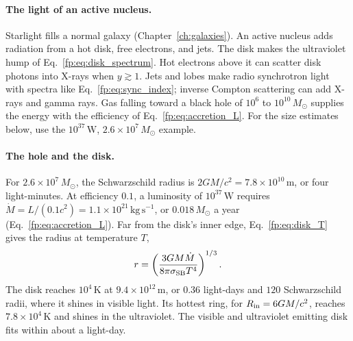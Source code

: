 \paragraph{The light of an active nucleus.} Starlight fills a normal galaxy (Chapter~\ref{ch:galaxies}). An active nucleus adds radiation from a hot disk, free electrons, and jets. The disk makes the ultraviolet hump of Eq.~\eqref{fp:eq:disk_spectrum}. Hot electrons above it can scatter disk photons into X-rays when $y\gtrsim1$. Jets and lobes make radio synchrotron light with spectra like Eq.~\eqref{fp:eq:sync_index}; inverse Compton scattering can add X-rays and gamma rays. Gas falling toward a black hole of $10^6$ to $10^{10}\,M_\odot$ supplies the energy with the efficiency of Eq.~\eqref{fp:eq:accretion_L}. For the size estimates below, use the $10^{37}\,\mathrm W$, $2.6\times10^7\,M_\odot$ example.

\paragraph{The hole and the disk.} For $2.6\times10^7\,M_\odot$, the Schwarzschild radius is $2GM/c^2=7.8\times10^{10}\,\mathrm m$, or four light-minutes. At efficiency $0.1$, a luminosity of $10^{37}\,\mathrm W$ requires $\dot M=L/(0.1c^2)=1.1\times10^{21}\,\mathrm{kg\,s^{-1}}$, or $0.018\,M_\odot$ a year (Eq.~\eqref{fp:eq:accretion_L}). Far from the disk's inner edge, Eq.~\eqref{fp:eq:disk_T} gives the radius at temperature $T$,
\[
r=\left(\frac{3GM\dot M}{8\pi\sigma_{\rm SB}T^4}\right)^{1/3}.
\]
The disk reaches $10^4\,\mathrm K$ at $9.4\times10^{12}\,\mathrm m$, or $0.36$ light-days and $120$ Schwarzschild radii, where it shines in visible light. Its hottest ring, for $R_{\rm in}=6GM/c^2$, reaches $7.8\times10^4\,\mathrm K$ and shines in the ultraviolet. The visible and ultraviolet emitting disk fits within about a light-day.

